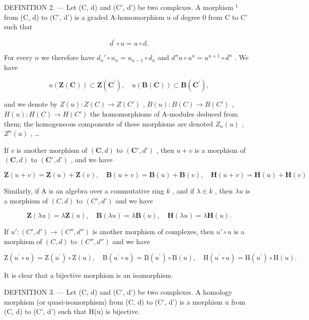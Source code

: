 DEFINITION 2. --- Let (C, d) and (C', d') be two complexes. A morphism \(^{1}\) from (C, d) to (C', d') is a graded A-homomorphism u of degree 0 from C to C' such that

\[
d ^ {\prime} \circ u = u \circ d.
\]

For every \(n\) we therefore have \(d_n' \circ u_n = u_{n-1} \circ d_n\) and \(d''n \circ u^n = u^{n+1} \circ d^n\) . We have

\[
u (\mathbf {Z} (\mathbf {C})) \subset \mathbf {Z} (\mathbf {C} ^ {\prime}), \quad u (\mathbf {B} (\mathbf {C})) \subset \mathbf {B} (\mathbf {C} ^ {\prime}),
\]

and we denote by \(Z(u):Z(C)\to Z(C')\) , \(B(u):B(C)\to B(C')\) , \(H(u):H(C)\to H(C')\) the homomorphisms of A-modules deduced from them; the homogeneous components of these morphisms are denoted \(Z_{n}(u)\) , \(Z^{n}(u)\) , \ldots{}

If \(v\) is another morphism of \((\mathbf{C}, d)\) to \((\mathbf{C}', d')\) , then \(u + v\) is a morphism of \((\mathbf{C}, d)\) to \((\mathbf{C}', d')\) , and we have

\[
\mathbf {Z} (u + v) = \mathbf {Z} (u) + \mathbf {Z} (v), \quad \mathbf {B} (u + v) = \mathbf {B} (u) + \mathbf {B} (v), \quad \mathbf {H} (u + v) = \mathbf {H} (u) + \mathbf {H} (v)
\]

Similarly, if A is an algebra over a commutative ring \(k\) , and if \(\lambda \in k\) , then \(\lambda u\) is a morphism of \((C, d)\) to \((C', d')\) and we have

\[
\mathbf {Z} (\lambda u) = \lambda \mathbf {Z} (u), \quad \mathbf {B} (\lambda u) = \lambda \mathbf {B} (u), \quad \mathbf {H} (\lambda u) = \lambda \mathbf {H} (u).
\]

If \(u': (C', d') \to (C'', d'')\) is another morphism of complexes, then \(u' \circ u\) is a morphism of \((C, d)\) to \((C'', d'')\) and we have

\[
\mathrm{Z} \left(u ^ {\prime} \circ u\right) = \mathrm{Z} \left(u ^ {\prime}\right) \circ \mathrm{Z} (u), \quad \mathrm{B} \left(u ^ {\prime} \circ u\right) = \mathrm{B} \left(u ^ {\prime}\right) \circ \mathrm{B} (u), \quad \mathrm{H} \left(u ^ {\prime} \circ u\right) = \mathrm{H} \left(u ^ {\prime}\right) \circ \mathrm{H} (u).
\]

It is clear that a bijective morphism is an isomorphism.

DEFINITION 3. --- Let (C, d) and (C', d') be two complexes. A homology morphism (or quasi-isomorphism) from (C, d) to (C', d') is a morphism u from (C, d) to (C', d') such that H(u) is bijective.

